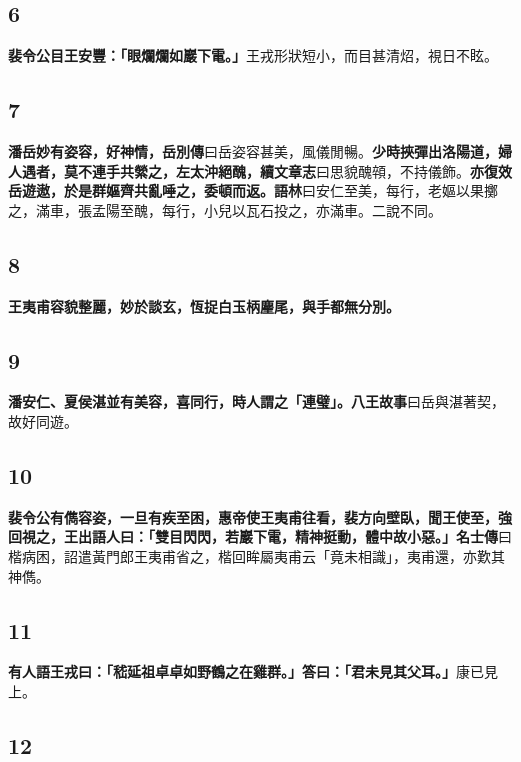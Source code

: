 \subsection*{6}

\textbf{裴令公目王安豐：「眼爛爛如巖下電。」}{\footnotesize 王戎形狀短小，而目甚清炤，視日不眩。}

\subsection*{7}

\textbf{潘岳妙有姿容，好神情，}{\footnotesize \textbf{岳別傳}曰岳姿容甚美，風儀閒暢。}\textbf{少時挾彈出洛陽道，婦人遇者，莫不連手共縈之，左太沖絕醜，}{\footnotesize \textbf{續文章志}曰思貌醜顇，不持儀飾。}\textbf{亦復效岳遊遨，於是群嫗齊共亂唾之，委頓而返。}{\footnotesize \textbf{語林}曰安仁至美，每行，老嫗以果擲之，滿車，張孟陽至醜，每行，小兒以瓦石投之，亦滿車。二說不同。}

\subsection*{8}

\textbf{王夷甫容貌整麗，妙於談玄，恆捉白玉柄麈尾，與手都無分別。}

\subsection*{9}

\textbf{潘安仁、夏侯湛並有美容，喜同行，時人謂之「連璧」。}{\footnotesize \textbf{八王故事}曰岳與湛著契，故好同遊。}

\subsection*{10}

\textbf{裴令公有儁容姿，一旦有疾至困，惠帝使王夷甫往看，裴方向壁臥，聞王使至，強回視之，王出語人曰：「雙目閃閃，若巖下電，精神挺動，體中故小惡。」}{\footnotesize \textbf{名士傳}曰楷病困，詔遣黃門郎王夷甫省之，楷回眸屬夷甫云「竟未相識」，夷甫還，亦歎其神儁。}

\subsection*{11}

\textbf{有人語王戎曰：「嵇延祖卓卓如野鶴之在雞群。」答曰：「君未見其父耳。」}{\footnotesize 康已見上。}

\subsection*{12}

